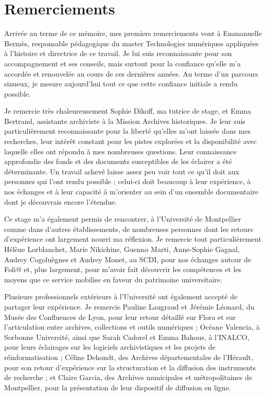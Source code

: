 
\chapter*{Remerciements}

Arrivée au terme de ce mémoire, mes premiers remerciements vont à Emmanuelle Bermès, responsable pédagogique du master Technologies numériques appliquées à l'histoire et directrice de ce travail. Je lui suis reconnaissante pour son accompagnement et ses conseils, mais surtout pour la confiance qu'elle m'a accordée et renouvelée au cours de ces dernières années. Au terme d'un parcours sinueux, je mesure aujourd'hui tout ce que cette confiance initiale a rendu possible.

Je remercie très chaleureusement Sophie Dikoff, ma tutrice de stage, et Emma Bertrand, assistante archiviste à la Mission Archives historiques. Je leur suis particulièrement reconnaissante pour la liberté qu'elles m'ont laissée dans mes recherches, leur intérêt constant pour les pistes explorées et la disponibilité avec laquelle elles ont répondu à mes nombreuses questions. Leur connaissance approfondie des fonds et des documents susceptibles de les éclairer a été déterminante. Un travail achevé laisse assez peu voir tout ce qu'il doit aux personnes qui l'ont rendu possible ; celui-ci doit beaucoup à leur expérience, à nos échanges et à leur capacité à m'orienter au sein d'un ensemble documentaire dont je découvrais encore l'étendue.

Ce stage m'a également permis de rencontrer, à l'Université de Montpellier comme dans d'autres établissements, de nombreuses personnes dont les retours d'expérience ont largement nourri ma réflexion. Je remercie tout particulièrement Hélène Lorblanchet, Marie Nikichine, Guenno Marti, Anne-Sophie Gagnal, Audrey Cogoluègnes et Audrey Monet, au SCDI, pour nos échanges autour de Foli@ et, plus largement, pour m'avoir fait découvrir les compétences et les moyens que ce service mobilise en faveur du patrimoine universitaire.

Plusieurs professionnels extérieurs à l'Université ont également accepté de partager leur expérience. Je remercie Pauline Laugraud et Jérémie Léonard, du Musée des Confluences de Lyon, pour leur retour détaillé sur Flora et sur l'articulation entre archives, collections et outils numériques ; Océane Valencia, à Sorbonne Université, ainsi que Sarah Cadorel et Emma Bahous, à l'INALCO, pour leurs éclairages sur les logiciels archivistiques et les projets de réinformatisation ; Céline Dehondt, des Archives départementales de l'Hérault, pour son retour d'expérience sur la structuration et la diffusion des instruments de recherche ; et Claire Garcia, des Archives municipales et métropolitaines de Montpellier, pour la présentation de leur dispositif de diffusion en ligne.

